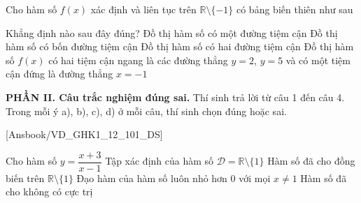 \documentclass[12pt,a4paper,openany,oneside]{book}
\newcommand{\phanDe}[1]{\par\medskip\noindent #1\par\smallskip}
\begin{document}
\begin{ex}%
	Cho hàm số $f(x)$ xác định và liên tục trên $\mathbb{R}\setminus \{-1\}$  có bảng biến thiên như sau
	\begin{center}
	\end{center}
	Khẳng định nào sau đây đúng? 
	 \choice
		{Đồ thị hàm số có một  đường tiệm cận}
		{Đồ  thị hàm số có bốn đường tiệm cận}
		{Đồ thị hàm số có  hai đường tiệm cận}
		{\True Đồ thị hàm số $f(x)$ có hai tiệm cận ngang  là các đường thẳng $y=2$, $y=5$ và có một tiệm cận đứng là đường thẳng $x=-1$}
\end{ex}


\phanDe{\textbf{PHẦN II. Câu trắc nghiệm đúng sai.} Thí sinh trả lời từ câu 1 đến câu 4. Trong mỗi ý a), b), c), d) ở mỗi câu, thí sinh chọn đúng hoặc sai.}

\setcounter{ex}{0}

[Ansbook/VD_GHK1_12_101_DS]

\begin{ex}%
		Cho hàm số  $y=\dfrac{x+3}{x-1}$
	 \choiceTF
			{\True Tập  xác định của hàm số $\mathscr{D} = \mathbb{R} \setminus \{1 \}$}
			{Hàm số đã cho đồng biến trên  $\mathbb{R} \setminus \{1 \}$}
			{\True Đạo hàm của  hàm số luôn nhỏ hơn $0$ với mọi $x \neq 1$}
			{\True Hàm  số đã cho không có cực trị}
	\end{ex}
\end{document}
